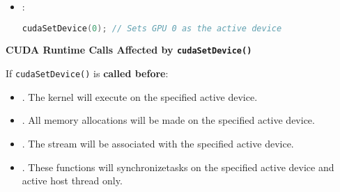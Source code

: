\begin{itemize}
\begin{itemize}
\begin{itemize}
        \end{itemize}
        \item {}:
        \begin{lstlisting}[language=C++]
cudaSetDevice(0); // Sets GPU 0 as the active device\end{lstlisting}
    \end{itemize}
    \begin{flushleft}
      \textcolor{Green3}{ \textbf{CUDA Runtime Calls Affected by \texttt{cudaSetDevice()}}}
    \end{flushleft}
    If \texttt{cudaSetDevice()} is \textbf{called before}:
    \begin{itemize}
      \item {}. The kernel will execute on the specified active device.
      \item {}. All memory allocations will be made on the specified active device.
      \item {}. The stream will be associated with the specified active device.
      \item {}. These functions will synchronize\break tasks on the specified active device and active host thread only.
    \end{itemize}


\end{itemize}
